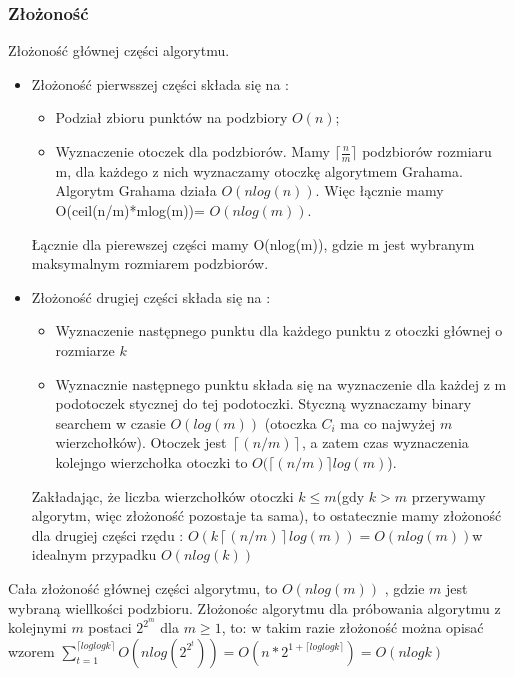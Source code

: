 \documentclass[11pt]{article}
\theoremstyle{remark} \newtheorem{definition}{def.}
\theoremstyle{definition} \newtheorem{twierdzenie}{tw.}
\begin{document}
    \subsubsection{Złożoność}
    Złożoność głównej części algorytmu.
    \begin{itemize}
        \item Złożoność pierwsszej części składa się na :
                \begin{itemize}
                    \item   Podział zbioru punktów na podzbiory $O(n)$;
                    \item   Wyznaczenie otoczek dla podzbiorów. Mamy $\lceil \frac{n}{m} \rceil$ podzbiorów
                            rozmiaru m, dla każdego z nich wyznaczamy otoczkę algorytmem Grahama.
                            Algorytm Grahama działa $O(nlog(n))$. Więc łącznie mamy O(ceil(n/m)*mlog(m))=
                            $O(nlog(m))$.
                \end{itemize}
                Łącznie dla pierewszej części mamy O(nlog(m)), gdzie m jest wybranym maksymalnym
                 rozmiarem podzbiorów.

        \item Złożoność drugiej części składa się na :
                 \begin{itemize}
                     \item   Wyznaczenie następnego punktu dla każdego punktu z otoczki głównej o rozmiarze $k$
                     \item   Wyznacznie następnego punktu składa się na wyznaczenie dla każdej z m podotoczek
                            stycznej do tej podotoczki. Styczną wyznaczamy binary searchem w czasie $O(log(m))$
                            (otoczka $C_i$ ma co najwyżej $m$ wierzchołków). Otoczek jest $\left\lceil(n/m) \right\rceil$, a zatem czas
                            wyznaczenia kolejngo wierzchołka otoczki to $O(\lceil(n/m)\rceil log(m)$).    
                 \end{itemize}
                 Zakładając, że liczba wierzchołków otoczki $k \le m$(gdy $k > m$ przerywamy algorytm, więc złożoność pozostaje ta sama),
                  to ostatecznie mamy złożoność dla drugiej części rzędu : $O(k \left\lceil(n/m)\right\rceil log(m)) = O(nlog(m)) $w idealnym przypadku $O(nlog(k))$
    \end{itemize}

    Cała złożoność głównej części algorytmu, to $O(nlog(m))$ , gdzie $m$ jest wybraną wiellkości podzbioru.
    Złożonośc algorytmu dla próbowania algorytmu z kolejnymi $m$ postaci $2^{2^m}$ dla $m \ge 1$, to:
    w takim razie złożoność można opisać wzorem $ \sum_{t=1}^{\lceil log log k \rceil} O(n log (2^{2^t}))=
    O(n*2^{1+{\lceil log log k \rceil}})=O(nlog k) $
\end{document}
